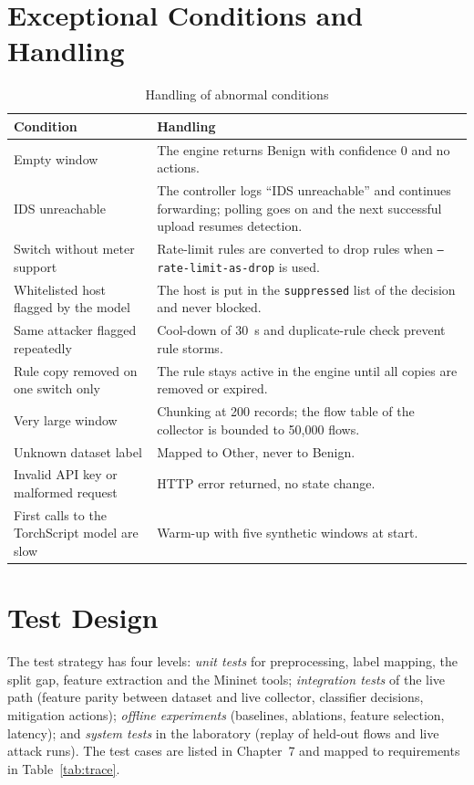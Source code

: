 \section{Exceptional Conditions and Handling}
\begin{table}[htbp]
\centering
\caption{Handling of abnormal conditions}
\label{tab:exceptions}
\small
\begin{tabularx}{\textwidth}{|p{4.0cm}|X|}
\hline
\textbf{Condition} & \textbf{Handling} \\ \hline
Empty window & The engine returns Benign with confidence 0 and no actions. \\ \hline
IDS unreachable & The controller logs ``IDS unreachable'' and continues forwarding; polling goes on and the next successful upload resumes detection. \\ \hline
Switch without meter support & Rate-limit rules are converted to drop rules when \texttt{--rate-limit-as-drop} is used. \\ \hline
Whitelisted host flagged by the model & The host is put in the \texttt{suppressed} list of the decision and never blocked. \\ \hline
Same attacker flagged repeatedly & Cool-down of 30~s and duplicate-rule check prevent rule storms. \\ \hline
Rule copy removed on one switch only & The rule stays active in the engine until all copies are removed or expired. \\ \hline
Very large window & Chunking at 200 records; the flow table of the collector is bounded to 50,000 flows. \\ \hline
Unknown dataset label & Mapped to Other, never to Benign. \\ \hline
Invalid API key or malformed request & HTTP error returned, no state change. \\ \hline
First calls to the TorchScript model are slow & Warm-up with five synthetic windows at start. \\ \hline
\end{tabularx}
\end{table}

\section{Test Design}
The test strategy has four levels: \emph{unit tests} for preprocessing, label mapping, the split gap, feature extraction and the Mininet tools; \emph{integration tests} of the live path (feature parity between dataset and live collector, classifier decisions, mitigation actions); \emph{offline experiments} (baselines, ablations, feature selection, latency); and \emph{system tests} in the laboratory (replay of held-out flows and live attack runs). The test cases are listed in Chapter~7 and mapped to requirements in Table~\ref{tab:trace}.

